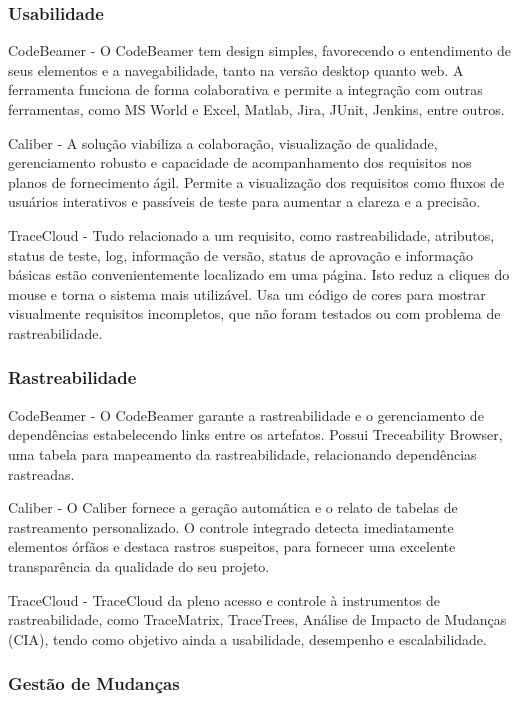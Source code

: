 \subsubsection{Usabilidade}

CodeBeamer - O CodeBeamer tem design simples, favorecendo o entendimento de seus elementos e a navegabilidade, tanto na versão desktop quanto web. A ferramenta funciona de forma colaborativa e permite a integração com outras ferramentas, como MS World e Excel, Matlab, Jira, JUnit, Jenkins, entre outros.

Caliber - A solução viabiliza a colaboração, visualização de qualidade, gerenciamento robusto e capacidade de acompanhamento dos requisitos nos planos de fornecimento ágil. Permite a visualização dos requisitos como fluxos de usuários interativos e passíveis de teste para aumentar a clareza e a precisão.

TraceCloud - Tudo relacionado a um requisito, como rastreabilidade, atributos, status de teste, log, informação de versão, status de aprovação e informação básicas estão convenientemente localizado em uma página. Isto reduz a cliques do mouse e torna o sistema mais utilizável. Usa um código de cores para mostrar visualmente requisitos incompletos, que não foram testados ou com problema de rastreabilidade.

\subsubsection{Rastreabilidade}

CodeBeamer - O CodeBeamer garante a rastreabilidade e o gerenciamento de dependências estabelecendo links entre os artefatos. Possui Treceability Browser, uma tabela para mapeamento da rastreabilidade, relacionando dependências rastreadas.

Caliber - O Caliber fornece a geração automática e o relato de tabelas de rastreamento personalizado. O controle integrado detecta imediatamente elementos órfãos e destaca rastros suspeitos, para fornecer uma excelente transparência da qualidade do seu projeto.

TraceCloud - TraceCloud da pleno acesso e controle à instrumentos de rastreabilidade, como TraceMatrix, TraceTrees, Análise de Impacto de Mudanças (CIA), tendo como objetivo ainda a usabilidade, desempenho e escalabilidade.

\subsubsection{Gestão de Mudanças}

